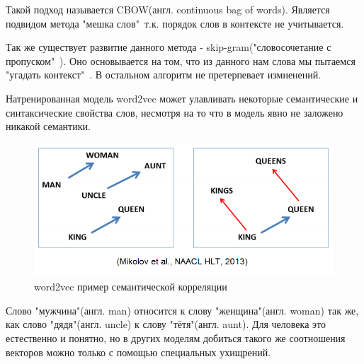 Такой подход называется CBOW(англ. continuous bag of words). Является подвидом метода "мешка слов"\ т.к. порядок слов в контексте не учитывается. 

Так же существует развитие данного метода - skip-gram\cite{Book28}("словосочетание с пропуском"\ ). Оно основывается на том, что  из данного нам слова мы пытаемся "угадать контекст"\ . В остальном алгоритм не претерпевает измненений.

Натренированная модель word2vec может улавливать некоторые семантические и синтаксические свойства слов, несмотря на то что в модель явно не заложено никакой семантики.
\begin{figure}[!h]
	\centering
	\includegraphics[width=.5\textwidth]{master_img/word2vec_example.png}
	\caption{word2vec пример семантической корреляции\cite{Book28}}
	\label{fig04_master}
\end{figure}
Слово "мужчина"(англ. man) относится к слову "женщина"(англ. woman) так же, как слово "дядя"(англ. uncle) к слову "тётя"(англ. aunt). Для человека это естественно и понятно, но в других моделям добиться такого же соотношения векторов можно только с помощью специальных ухищрений.
